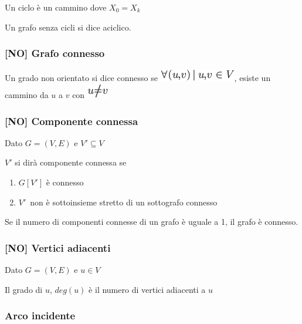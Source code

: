\documentclass{article}
\providecommand{\tightlist}{%
  \setlength{\itemsep}{0pt}\setlength{\parskip}{0pt}}
\begin{document}
{{Un ciclo è un cammino dove $X_0 = X_k$}

{Un grafo senza cicli si dice aciclico.}

\hypertarget{h.rpdf8j1vq7g0}{\subsubsection{\texorpdfstring{{{[}NO{]}
Grafo connesso}}{{[}NO{]} Grafo connesso}}\label{h.rpdf8j1vq7g0}}

{Un grado non orientato si dice connesso se }\includegraphics{images/image354.png}{, esiste un cammino da $u$ a $v$ con }\includegraphics{images/image355.png}

\hypertarget{h.iejp6ankfctp}{\subsubsection{\texorpdfstring{{{[}NO{]} Componente connessa}}{{[}NO{]} Componente connessa}}\label{h.iejp6ankfctp}}

{Dato $G=(V,E)$ e $V' \subseteq V$}

{$V'$ si dirà componente connessa se }

\begin{enumerate}
\tightlist
\item
  {$G[V']$ è connesso}
\item
  $V'${~non è sottoinsieme stretto di un sottografo connesso}
\end{enumerate}

{}

{Se il numero di componenti connesse di un grafo è uguale a 1, }{il
grafo è connesso.}

\hypertarget{h.5nknzat57p06}{\subsubsection{\texorpdfstring{{{[}NO{]}
Vertici adiacenti}}{{[}NO{]} Vertici adiacenti}}\label{h.5nknzat57p06}}

{Dato $G=(V,E)$ e $u \in V$}

{Il grado di $u$, $deg(u)$ è il numero di vertici adiacenti a $u$}

\hypertarget{h.52hqmabofvh0}{\subsubsection{\texorpdfstring{{Arco
incidente}}{Arco incidente}}\label{h.52hqmabofvh0}}

}
\end{document}
